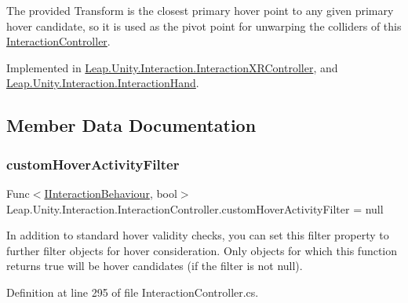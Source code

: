 The provided Transform is the closest primary hover point to any given primary hover candidate, so it is used as the pivot point for unwarping the colliders of this \mbox{\hyperlink{class_leap_1_1_unity_1_1_interaction_1_1_interaction_controller}{Interaction\+Controller}}. 

Implemented in \mbox{\hyperlink{class_leap_1_1_unity_1_1_interaction_1_1_interaction_x_r_controller_aae371c99d08f9ce6e8850e36109690c5}{Leap.\+Unity.\+Interaction.\+Interaction\+X\+R\+Controller}}, and \mbox{\hyperlink{class_leap_1_1_unity_1_1_interaction_1_1_interaction_hand_a223e3ae675f5017063a14f8f1305ed7a}{Leap.\+Unity.\+Interaction.\+Interaction\+Hand}}.



\subsection{Member Data Documentation}
\mbox{\label{class_leap_1_1_unity_1_1_interaction_1_1_interaction_controller_a877fe13bf17b656525d7bf63e3baa8d8}} 
\subsubsection{\texorpdfstring{customHoverActivityFilter}{customHoverActivityFilter}}
{\footnotesize\ttfamily Func$<$\mbox{\hyperlink{interface_leap_1_1_unity_1_1_interaction_1_1_i_interaction_behaviour}{I\+Interaction\+Behaviour}}, bool$>$ Leap.\+Unity.\+Interaction.\+Interaction\+Controller.\+custom\+Hover\+Activity\+Filter = null}



In addition to standard hover validity checks, you can set this filter property to further filter objects for hover consideration. Only objects for which this function returns true will be hover candidates (if the filter is not null). 



Definition at line 295 of file Interaction\+Controller.\+cs.

\mbox{\label{class_leap_1_1_unity_1_1_interaction_1_1_interaction_controller_a11c7de0dc654832053eb8cdd2ab6bce8}} 
